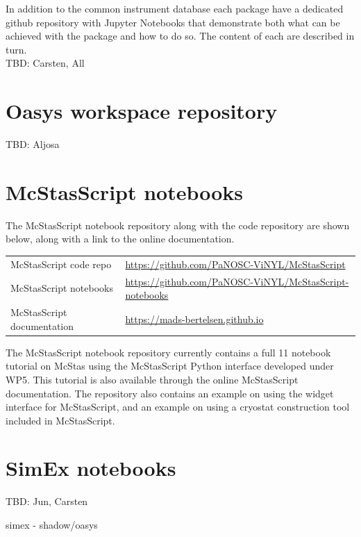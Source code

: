 \documentclass[10pt]{scrartcl}
\begin{document}
In addition to the common instrument database each package have a dedicated github repository with Jupyter Notebooks that demonstrate both what can be achieved with the package and how to do so. The content of each are described in turn.
\\
TBD: Carsten, All

\section{Oasys workspace repository}
\label{sec:oasys}
TBD: Aljosa

\section{McStasScript notebooks}
\label{sec:mcstas}
The McStasScript notebook repository along with the code repository are shown below, along with a link to the online documentation.
\begin{center}
\begin{tabular}{l l}
McStasScript code repo  & \url{https://github.com/PaNOSC-ViNYL/McStasScript} \\ 
McStasScript notebooks & \url{https://github.com/PaNOSC-ViNYL/McStasScript-notebooks} \\  
McStasScript documentation & \url{https://mads-bertelsen.github.io}
\end{tabular}
\end{center}
The McStasScript notebook repository currently contains a full 11 notebook tutorial on McStas using the McStasScript Python interface developed under WP5. This tutorial is also available through the online McStasScript documentation. The repository also contains an example on using the widget interface for McStasScript, and an example on using a cryostat construction tool included in McStasScript.

\section{SimEx notebooks}
\label{sec:simex}
TBD: Jun, Carsten

simex - shadow/oasys
\end{document}
